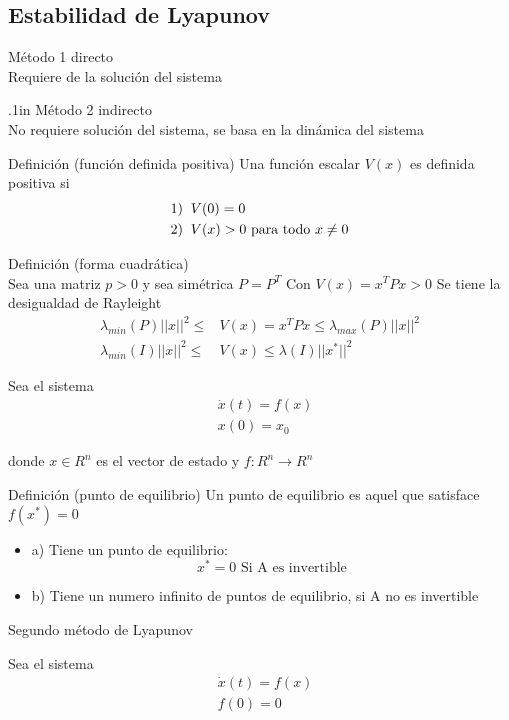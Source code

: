 \subsection{Estabilidad de Lyapunov}

Método 1 directo \\
Requiere de la solución del sistema

\parskip .1in
Método 2 indirecto \\
No requiere solución del sistema, se basa en la dinámica del sistema

Definición (función definida positiva)
Una función escalar \( V(x) \) es definida positiva si
\[
    \begin{split}
        1) & \;\; V(0) = 0 \\
        2) & \;\; V(x) > 0 \text{  para todo \( x \not = 0 \)}
    \end{split}
\]

Definición (forma cuadrática)\\
Sea una matriz \( p > 0 \) y sea simétrica \( P = P^{T} \)
Con \( V(x) = x^{T}Px > 0 \)
Se tiene la desigualdad de Rayleight
\[
    \begin{split}
        \lambda_{min}(P) ||x||^{2} \leq & V(x) = x^{T}Px \leq \lambda_{max} (P) ||x||^{2} \\
        \lambda_{min}(I)||x||^{2} \leq & V(x) \leq \lambda(I) ||x^{*}||^{2}
    \end{split}
\]

Sea el sistema
\[
    \begin{split}
        & \dot{x}(t) = f(x)\\
        & x(0) = x_{0}
    \end{split}
\]

donde \( x \in R^{n} \) es el vector de estado y \( f: R^{n} \to R^{n}\)

Definición  (punto de equilibrio)
Un punto de equilibrio es aquel que satisface \( f(x^{*}) = 0 \)
\begin{itemize}
    \item a) Tiene un punto de equilibrio: 
    \[
        x^{*} = 0 \text{  Si A es invertible}
    \]
    \item b) Tiene un numero infinito de puntos de equilibrio, si A no es invertible
\end{itemize}

Segundo método de Lyapunov

Sea el sistema
\[
    \begin{split}
        & \dot{x}(t) = f(x)\\
        & f(0) = 0
    \end{split}
\]

